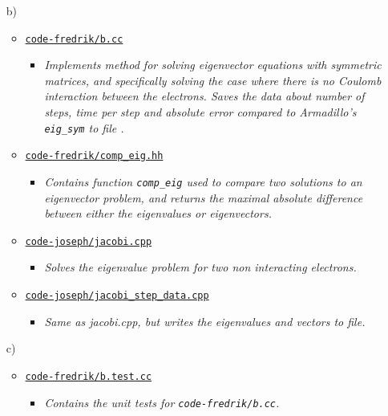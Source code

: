 \documentclass[11pt,a4paper]{article}
\begin{document}
\begin{enumerate}
  \item[b)]
  \begin{itemize}
    \item \href{https://github.com/frxstrem/fys3150/tree/master/project2/code-fredrik/b.cc}{\tt code-fredrik/b.cc}
    \begin{itemize}
      \item {\it Implements method for solving eigenvector equations with symmetric matrices, and specifically solving the case where there is no Coulomb interaction between the electrons. Saves the data about number of steps, time per step and absolute error compared to Armadillo's \texttt{eig\_sym} to file .}
    \end{itemize}
    \item \href{https://github.com/frxstrem/fys3150/tree/master/project2/code-fredrik/comp_eig.hh}{\tt code-fredrik/comp\_eig.hh}
    \begin{itemize}
      \item {\it Contains function \texttt{comp\_eig} used to compare two solutions to an eigenvector problem, and returns the maximal absolute difference between either the eigenvalues or eigenvectors.}
    \end{itemize}
    \item \href{https://github.com/frxstrem/fys3150/tree/master/project2/code-joseph/jacobi.cpp}{\tt code-joseph/jacobi.cpp}
    \begin{itemize}
      \item {\it Solves the eigenvalue problem for two non interacting electrons.}
    \end{itemize}
    \item \href{https://github.com/frxstrem/fys3150/tree/master/project2/code-joseph/jacobi_step_data.cpp}{\tt code-joseph/jacobi\_step\_data.cpp}
    \begin{itemize}
      \item {\it Same as jacobi.cpp, but writes the eigenvalues and vectors to file.}
    \end{itemize}
  \end{itemize}

  \item[c)]
  \begin{itemize}
    \item \href{https://github.com/frxstrem/fys3150/tree/master/project2/code-fredrik/b.test.cc}{\tt code-fredrik/b.test.cc}
    \begin{itemize}
      \item {\it Contains the unit tests for \texttt{code-fredrik/b.cc}.}
    \end{itemize}
  \end{itemize}


\end{enumerate}
\end{document}
